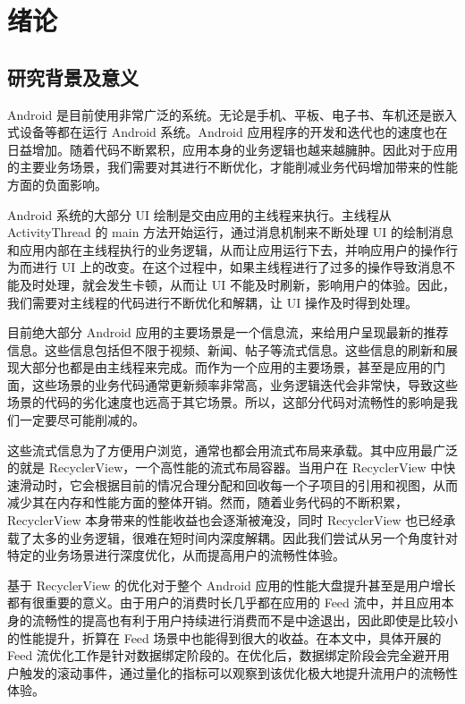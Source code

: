 \chapter{绪论}

\section{研究背景及意义}

Android 是目前使用非常广泛的系统\cite{businge2019studying}。无论是手机、平板、电子书、车机还是嵌入式设备等都在运行 Android 系统。Android 应用程序的开发和迭代也的速度也在日益增加。随着代码不断累积，应用本身的业务逻辑也越来越臃肿。因此对于应用的主要业务场景，我们需要对其进行不断优化，才能削减业务代码增加带来的性能方面的负面影响。

Android 系统的大部分 UI 绘制是交由应用的主线程来执行\cite{yan2014real}。主线程从 ActivityThread 的 main 方法开始运行，通过消息机制来不断处理 UI 的绘制消息和应用内部在主线程执行的业务逻辑，从而让应用运行下去，并响应用户的操作行为而进行 UI 上的改变。在这个过程中，如果主线程进行了过多的操作导致消息不能及时处理，就会发生卡顿，从而让 UI 不能及时刷新，影响用户的体验。因此，我们需要对主线程的代码进行不断优化和解耦，让 UI 操作及时得到处理。

目前绝大部分 Android 应用的主要场景是一个信息流，来给用户呈现最新的推荐信息。这些信息包括但不限于视频、新闻、帖子等流式信息。这些信息的刷新和展现大部分也都是由主线程来完成。而作为一个应用的主要场景，甚至是应用的门面，这些场景的业务代码通常更新频率非常高，业务逻辑迭代会非常快，导致这些场景的代码的劣化速度也远高于其它场景。所以，这部分代码对流畅性的影响是我们一定要尽可能削减的。

这些流式信息为了方便用户浏览，通常也都会用流式布局来承载。其中应用最广泛的就是 RecyclerView，一个高性能的流式布局容器\cite{sabiyath2020enhanced}。当用户在 RecyclerView 中快速滑动时，它会根据目前的情况合理分配和回收每一个子项目的引用和视图，从而减少其在内存和性能方面的整体开销。然而，随着业务代码的不断积累，RecyclerView 本身带来的性能收益也会逐渐被淹没，同时 RecyclerView 也已经承载了太多的业务逻辑，很难在短时间内深度解耦。因此我们尝试从另一个角度针对特定的业务场景进行深度优化，从而提高用户的流畅性体验。

基于 RecyclerView 的优化对于整个 Android 应用的性能大盘提升甚至是用户增长都有很重要的意义。由于用户的消费时长几乎都在应用的 Feed 流中，并且应用本身的流畅性的提高也有利于用户持续进行消费而不是中途退出，因此即使是比较小的性能提升，折算在 Feed 场景中也能得到很大的收益。在本文中，具体开展的 Feed 流优化工作是针对数据绑定阶段的。在优化后，数据绑定阶段会完全避开用户触发的滚动事件，通过量化的指标可以观察到该优化极大地提升流用户的流畅性体验。

